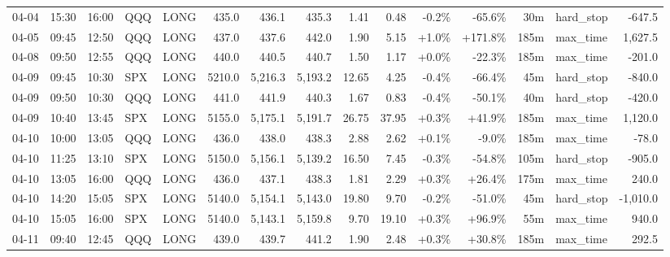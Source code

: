 \documentclass[11pt,a4paper,twoside]{article}
\begin{document}
\begin{landscape}
\begin{center}
\begin{longtable}{>{\color{txtmain}}l l l l l r r r r r r r r >{\color{txtmain}}l r}
04-04 & 15:30 & 16:00 & QQQ & LONG & 435.0 & 436.1 & 435.3 & 1.41 & 0.48 & \textcolor{lossred}{-0.2\%} & \textcolor{lossred}{-65.6\%} & 30m & hard\_stop & \textcolor{lossred}{-647.5} \\
04-05 & 09:45 & 12:50 & QQQ & LONG & 437.0 & 437.6 & 442.0 & 1.90 & 5.15 & \textcolor{wingreen}{+1.0\%} & \textcolor{wingreen}{+171.8\%} & 185m & max\_time & \textcolor{wingreen}{1,627.5} \\
04-08 & 09:50 & 12:55 & QQQ & LONG & 440.0 & 440.5 & 440.7 & 1.50 & 1.17 & \textcolor{wingreen}{+0.0\%} & \textcolor{lossred}{-22.3\%} & 185m & max\_time & \textcolor{lossred}{-201.0} \\
04-09 & 09:45 & 10:30 & SPX & LONG & 5210.0 & 5,216.3 & 5,193.2 & 12.65 & 4.25 & \textcolor{lossred}{-0.4\%} & \textcolor{lossred}{-66.4\%} & 45m & hard\_stop & \textcolor{lossred}{-840.0} \\
04-09 & 09:50 & 10:30 & QQQ & LONG & 441.0 & 441.9 & 440.3 & 1.67 & 0.83 & \textcolor{lossred}{-0.4\%} & \textcolor{lossred}{-50.1\%} & 40m & hard\_stop & \textcolor{lossred}{-420.0} \\
04-09 & 10:40 & 13:45 & SPX & LONG & 5155.0 & 5,175.1 & 5,191.7 & 26.75 & 37.95 & \textcolor{wingreen}{+0.3\%} & \textcolor{wingreen}{+41.9\%} & 185m & max\_time & \textcolor{wingreen}{1,120.0} \\
04-10 & 10:00 & 13:05 & QQQ & LONG & 436.0 & 438.0 & 438.3 & 2.88 & 2.62 & \textcolor{wingreen}{+0.1\%} & \textcolor{lossred}{-9.0\%} & 185m & max\_time & \textcolor{lossred}{-78.0} \\
04-10 & 11:25 & 13:10 & SPX & LONG & 5150.0 & 5,156.1 & 5,139.2 & 16.50 & 7.45 & \textcolor{lossred}{-0.3\%} & \textcolor{lossred}{-54.8\%} & 105m & hard\_stop & \textcolor{lossred}{-905.0} \\
04-10 & 13:05 & 16:00 & QQQ & LONG & 436.0 & 437.1 & 438.3 & 1.81 & 2.29 & \textcolor{wingreen}{+0.3\%} & \textcolor{wingreen}{+26.4\%} & 175m & max\_time & \textcolor{wingreen}{240.0} \\
04-10 & 14:20 & 15:05 & SPX & LONG & 5140.0 & 5,154.1 & 5,143.0 & 19.80 & 9.70 & \textcolor{lossred}{-0.2\%} & \textcolor{lossred}{-51.0\%} & 45m & hard\_stop & \textcolor{lossred}{-1,010.0} \\
04-10 & 15:05 & 16:00 & SPX & LONG & 5140.0 & 5,143.1 & 5,159.8 & 9.70 & 19.10 & \textcolor{wingreen}{+0.3\%} & \textcolor{wingreen}{+96.9\%} & 55m & max\_time & \textcolor{wingreen}{940.0} \\
04-11 & 09:40 & 12:45 & QQQ & LONG & 439.0 & 439.7 & 441.2 & 1.90 & 2.48 & \textcolor{wingreen}{+0.3\%} & \textcolor{wingreen}{+30.8\%} & 185m & max\_time & \textcolor{wingreen}{292.5} \\

\end{longtable}
\end{center}
\end{landscape}
\end{document}
